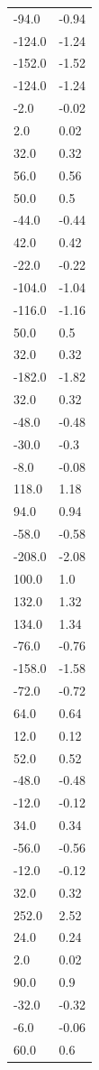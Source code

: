 \begin{longtable}{ll}
-94.0 & -0.94 \\
-124.0 & -1.24 \\
-152.0 & -1.52 \\
-124.0 & -1.24 \\
-2.0 & -0.02 \\
2.0 & 0.02 \\
32.0 & 0.32 \\
56.0 & 0.56 \\
50.0 & 0.5 \\
-44.0 & -0.44 \\
42.0 & 0.42 \\
-22.0 & -0.22 \\
-104.0 & -1.04 \\
-116.0 & -1.16 \\
50.0 & 0.5 \\
32.0 & 0.32 \\
-182.0 & -1.82 \\
32.0 & 0.32 \\
-48.0 & -0.48 \\
-30.0 & -0.3 \\
-8.0 & -0.08 \\
118.0 & 1.18 \\
94.0 & 0.94 \\
-58.0 & -0.58 \\
-208.0 & -2.08 \\
100.0 & 1.0 \\
132.0 & 1.32 \\
134.0 & 1.34 \\
-76.0 & -0.76 \\
-158.0 & -1.58 \\
-72.0 & -0.72 \\
64.0 & 0.64 \\
12.0 & 0.12 \\
52.0 & 0.52 \\
-48.0 & -0.48 \\
-12.0 & -0.12 \\
34.0 & 0.34 \\
-56.0 & -0.56 \\
-12.0 & -0.12 \\
32.0 & 0.32 \\
252.0 & 2.52 \\
24.0 & 0.24 \\
2.0 & 0.02 \\
90.0 & 0.9 \\
-32.0 & -0.32 \\
-6.0 & -0.06 \\
60.0 & 0.6 \\

\end{longtable}
